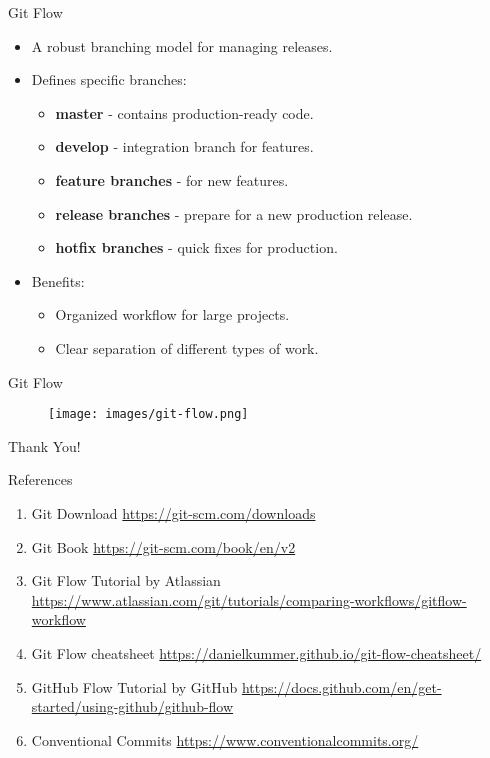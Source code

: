 \documentclass{beamer}
\begin{document}
\begin{frame}{Git Flow}
  \begin{itemize}
      \item A robust branching model for managing releases.
      \item Defines specific branches:
      \begin{itemize}
          \item \textbf{master} - contains production-ready code.
          \item \textbf{develop} - integration branch for features.
          \item \textbf{feature branches} - for new features.
          \item \textbf{release branches} - prepare for a new production release.
          \item \textbf{hotfix branches} - quick fixes for production.
      \end{itemize}
      \item Benefits:
      \begin{itemize}
          \item Organized workflow for large projects.
          \item Clear separation of different types of work.
      \end{itemize}
  \end{itemize}
\end{frame}

\begin{frame}{Git Flow}
  \begin{figure}[h]
    \centering
    \texttt{[image: images/git-flow.png]}
    \label{fig:git-flow}
  \end{figure}
\end{frame}

\begin{frame}
    \centering
    \Huge{Thank You!}
\end{frame}

\begin{frame}{References}
  \begin{enumerate}
    \item Git Download \href{https://git-scm.com/downloads}{https://git-scm.com/downloads}
    \item Git Book \href{https://git-scm.com/book/en/v2}{https://git-scm.com/book/en/v2}
    \item Git Flow Tutorial by Atlassian \href{https://www.atlassian.com/git/tutorials/comparing-workflows/gitflow-workflow}{https://www.atlassian.com/git/tutorials/comparing-workflows/gitflow-workflow}
    \item Git Flow cheatsheet \href{https://danielkummer.github.io/git-flow-cheatsheet/}{https://danielkummer.github.io/git-flow-cheatsheet/}
    \item GitHub Flow Tutorial by GitHub \href{https://docs.github.com/en/get-started/using-github/github-flow}{https://docs.github.com/en/get-started/using-github/github-flow}
    \item Conventional Commits \href{https://www.conventionalcommits.org/}{https://www.conventionalcommits.org/}
  \end{enumerate}
\end{frame}
\end{document}
